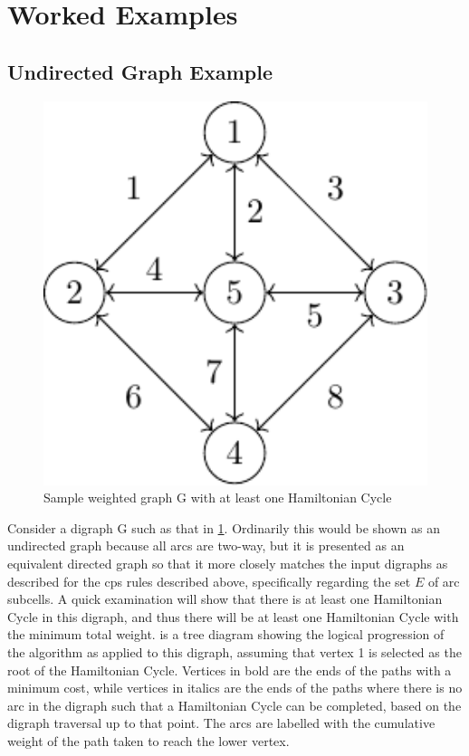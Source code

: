 \section{\label{sec:tsp:example}Worked Examples}

\subsection{Undirected Graph Example}

\begin{figure}
\centering
\includegraphics[keepaspectratio,width=1.0\textwidth,height=0.35\textheight]{chapters/tsp/figs/ugraph-figure0}
\caption{\label{fig:tsp:ugraph}Sample weighted graph G with at least one Hamiltonian Cycle}
\end{figure}

Consider a digraph G such as that in \cref{fig:tsp:ugraph}.  Ordinarily this would be shown as an undirected graph because all arcs are two-way, but it is presented as an equivalent directed graph so that it more closely matches the input digraphs as described for the \gls{cps} rules described above, specifically regarding the set \(E\) of arc subcells.  A quick examination will show that there is at least one Hamiltonian Cycle in this digraph, and thus there will be at least one Hamiltonian Cycle with the minimum total weight.   is a tree diagram showing the logical progression of the algorithm as applied to this digraph, assuming that vertex 1 is selected as the root of the Hamiltonian Cycle.  Vertices in bold are the ends of the paths with a minimum cost, while vertices in italics are the ends of the paths where there is no arc in the digraph such that a Hamiltonian Cycle can be completed, based on the digraph traversal up to that point.  The arcs are labelled with the cumulative weight of the path taken to reach the lower vertex.

